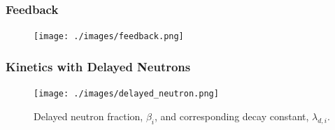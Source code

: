 \begin{frame}
\frametitle{Feedback}
  \begin{figure}[t]
   \texttt{[image: ./images/feedback.png]}
	\end{figure}
\end{frame}


\begin{frame}
\frametitle{Kinetics with Delayed Neutrons}
  \begin{figure}[t]
   \texttt{[image: ./images/delayed\_neutron.png]}
	\caption{Delayed neutron fraction, $\beta_i$, and corresponding decay constant, $\lambda_{d,i}$.}
	\end{figure}
\end{frame}

